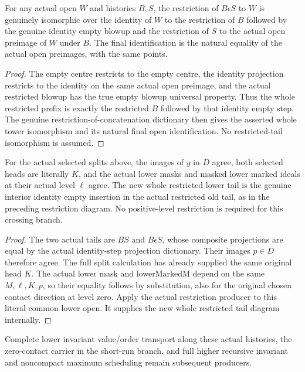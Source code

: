 \begin{lemma}
\label{hir:original-crossing-restricted-empty-history}
\leanok
{}
For any actual open $W$ and histories $B,S$, the restriction of $B\epsilon S$
to $W$ is genuinely isomorphic over the identity of $W$ to the restriction
of $B$ followed by the genuine identity empty blowup and the restriction of
$S$ to the actual open preimage of $W$ under $B$.  The final identification
is the natural equality of the actual open preimages, with the same points.
\end{lemma}
\begin{proof}
The empty centre restricts to the empty centre, the identity projection
restricts to the identity on the same actual open preimage, and the actual
restricted blowup has the true empty blowup universal property.  Thus the
whole restricted prefix is exactly the restricted $B$ followed by that
identity empty step.  The genuine restriction-of-concatenation dictionary
then gives the asserted whole tower isomorphism and its natural final
open identification.  No restricted-tail isomorphism is assumed.
\end{proof}

\begin{theorem}
\label{hir:original-interior-crossing-lower-history}
\leanok
{}
For the actual selected splits above, the images of $y$ in $D$ agree, both
selected heads are literally $K$, and the actual lower masks and masked
lower marked ideals at their actual level $\ell$ agree.  The new whole
restricted lower tail is the genuine interior identity empty insertion
in the actual restricted old tail, as in the preceding restriction diagram.
No positive-level restriction is required for this crossing branch.
\end{theorem}
\begin{proof}
The two actual tails are $BS$ and $B\epsilon S$, whose composite projections
are equal by the actual identity-step projection dictionary.  Their images
$p\in D$ therefore agree.  The full split calculation has already supplied
the same original head $K$.  The actual lower mask and lowerMarkedM depend
on the same $M,\ell,K,p$, so their equality follows by substitution, also
for the original chosen contact direction at level zero.  Apply the actual
restriction producer to this literal common lower open.  It supplies the
new whole restricted tail diagram internally.
\end{proof}

Complete lower invariant value/order transport along these actual histories,
the zero-contact carrier in the short-run branch, and full higher recursive
invariant and noncompact maximum scheduling remain subsequent producers.
